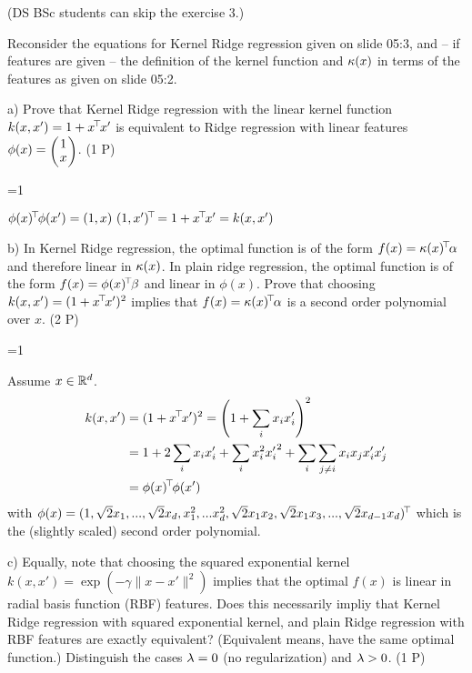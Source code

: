 

\renewcommand{\course}{Machine Learning}
\renewcommand{\exnum}{7}

\exercises

(DS BSc students can skip the exercise 3.)



Reconsider the equations for Kernel Ridge regression given on slide
05:3, and -- if features are given -- the definition of the kernel
function and $\kappa(x)$ in terms of the features as given on slide 05:2.

a) Prove that Kernel Ridge regression with the linear kernel function
$k(x,x') = 1 + x^{\!\top\!} x'$ is equivalent to Ridge regression with linear
features $\phi(x) = \mat{c}{1 \\ x}$. (1 P)

\ifnum\value{solutions}=1
\begin{solution}
$\phi(x)^{\!\top\!} \phi(x') = (1, x)~ (1, x')^{\!\top\!} = 1 +x^{\!\top\!} x^\prime = k(x,x')$
\end{solution}
\fi

b) In Kernel Ridge regression, the optimal function is of the form
$f(x) = \kappa(x)^{\!\top\!} \alpha$ and therefore linear in $\kappa(x)$. In plain ridge
regression, the optimal function is of the form $f(x) = \phi(x)^{\!\top\!} \beta$
and linear in $\phi(x)$. Prove that choosing $k(x,x') = (1+ x^{\!\top\!} x')^2$
implies that $f(x) = \kappa(x)^{\!\top\!} \alpha$ is a second order polynomial over
$x$.  (2 P)

\ifnum\value{solutions}=1
\begin{solution}
Assume $x \in {\mathbb{R}}^d$.
\begin{align}
	k(x,x') &= (1 +x^{\!\top\!} x')^2 = \left(1 + \sum_i x_i x'_i\right)^2 \\
	&= 1 + 2 \sum_i x_i x'_i + \sum_i x_i^2 {x'_i}^2 + \sum_i\sum_{j\neq i} x_i x_j x'_i x'_j \\
	&= \phi(x)^{\!\top\!} \phi(x')
\end{align}
with $\phi(x) = (1, \sqrt{2}x_1, ..., \sqrt{2}x_d, x_1^2, ... x_d^2, \sqrt{2}x_1x_2, \sqrt{2}x_1x_3, ..., \sqrt{2}x_{d-1}x_d)^{\!\top\!}$ which is the (slightly scaled) second order polynomial.
\end{solution}
\fi

c) Equally, note that choosing the squared exponential kernel $k(x,x')
= \exp(-\gamma \|x-x'\|^2)$ implies that the optimal $f(x)$ is linear
in radial basis function (RBF) features. Does this necessarily impliy
that Kernel Ridge regression with squared exponential kernel, and
plain Ridge regression with RBF features are exactly equivalent?
(Equivalent means, have the same optimal function.) Distinguish the
cases $\lambda=0$ (no regularization) and $\lambda>0$.  (1 P)

